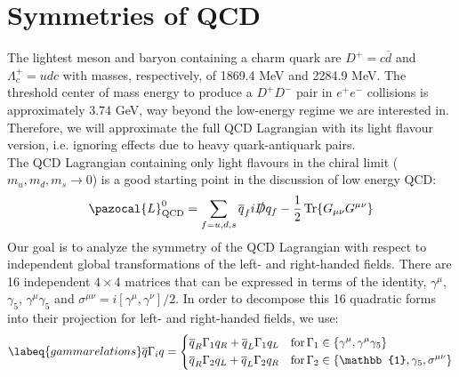 \documentclass[../main.tex]{subfiles}
\begin{document}
\section{Symmetries of QCD}
The lightest meson and baryon containing a charm quark are $D^+=c\overline{d}$ and $\Lambda_c^+=udc$ with masses, respectively, of 1869.4 MeV and 2284.9 MeV. The threshold center of mass energy to produce a $D^+D^-$ pair in $e^+e^-$ collisions is approximately 3.74 GeV, way beyond the low-energy regime we are interested in. Therefore, we will approximate the full QCD Lagrangian with its light flavour version, i.e. ignoring effects due to heavy quark-antiquark pairs.\\
The QCD Lagrangian containing only light flavours in the chiral limit ($m_u,m_d,m_s\to0$) is a good starting point in the discussion of low energy QCD:
\[
\pazocal{L}_{\text{QCD}}^0=\sum_{f=u,d,s}\overline{q}_fi\slashed{D}q_f-\frac{1}{2}\Tr{G_{\mu\nu}G^{\mu\nu}}
\]
Our goal is to analyze the symmetry of the QCD Lagrangian with respect to independent global transformations of the left- and right-handed fields. There are 16 independent $4\times4$ matrices that can be expressed in terms of the identity, $\gamma^\mu$, $\gamma_5$, $\gamma^\mu\gamma_5$ and $\sigma^{\mu\nu}=i[\gamma^\mu,\gamma^\nu]/2$. In order to decompose this 16 quadratic forms into their projection for left- and right-handed fields, we use:
\begin{equation}
\labeq{gammarelations}
\overline{q}\Gamma_iq=\left\{
\begin{aligned}
&\overline{q}_R\Gamma_1q_R+\overline{q}_L\Gamma_1q_L \quad \text{for}\,\Gamma_1\in\{\gamma^\mu,\gamma^\mu\gamma_5\}\\
&\overline{q}_R\Gamma_2q_L+\overline{q}_L\Gamma_2q_R \quad \text{for}\,\Gamma_2\in\{\mathbb{1},\gamma_5,\sigma^{\mu\nu}\}
\end{aligned}
\right.
\end{equation}
\end{document}
